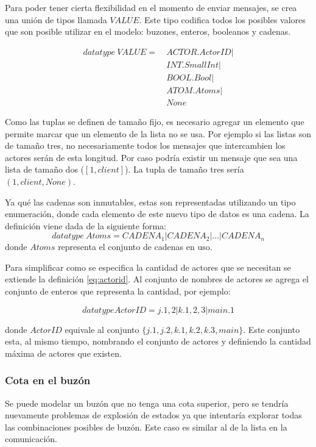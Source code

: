 Para poder tener cierta flexibilidad en el momento de enviar mensajes, se crea una unión de tipos llamada $VALUE$. Este tipo codifica todos los posibles valores que son posible utilizar en el modelo: buzones, enteros, booleanos y cadenas. 

\begin{align*}
datatype\ VALUE =\ & ACTOR.ActorID | \\
& INT.SmallInt | \\
& BOOL.Bool |  \\
& ATOM.Atoms | \\
& None
\end{align*}


Como las tuplas se definen de tamaño fijo, es necesario agregar un elemento que permite marcar que un elemento de la lista no se usa. Por ejemplo si las listas son de tamaño tres, no necesariamente todos los mensajes que intercambien los actores serán de esta longitud. Por caso podría existir un mensaje que sea una lista de tamaño dos ($[1, client]$). La tupla de tamaño tres sería $(1, client, None)$. 

Ya qué las cadenas son inmutables, estas son representadas utilizando un tipo enumeración, donde cada elemento de este nuevo tipo de datos es una cadena. La definición viene dada de la siguiente forma:
\begin{equation*}
  datatype\ Atoms = CADENA_1 | CADENA_2 | \ldots | CADENA_n	
\end{equation*}
donde $Atoms$ representa el conjunto de cadenas en uso.

Para simplificar como se especifica la cantidad de actores que se necesitan se extiende la definición \eqref{eq:actorid}. Al conjunto de nombres de actores se agrega el conjunto de enteros que representa la cantidad, por ejemplo:

\[
  datatype ActorID = j.{1,2} | k.{1,2,3} | main.{1}
\]

donde $ActorID$ equivale al conjunto $\{j.1, j.2, k.1, k.2, k.3, main\}$. Este conjunto esta, al mismo tiempo, nombrando el conjunto de actores y definiendo la cantidad máxima de actores que existen.

\subsubsection*{Cota en el buzón}

Se puede modelar un buzón que no tenga una cota superior, pero se tendría nuevamente problemas de explosión de estados ya que \FDR intentaría explorar todas las combinaciones posibles de buzón. Este caso es similar al de la lista en la comunicación. 

